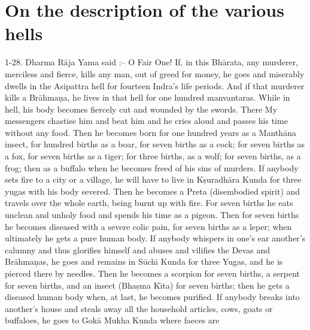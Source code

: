 \chapter{On the description of the various hells}

1-28. Dharma R\=aja Yama said :-- O Fair One! If, in this Bh\=arata, any murderer, merciless and fierce, kills any man, out of greed for money, he goes and miserably dwells in the Asipattra hell for fourteen Indra's life periods. And if that murderer kills a Br\=ahma\d{n}a, he lives in that hell for one hundred manvantaras. While in hell, his body becomes fiercely cut and wounded by the swords. There My messengers chastise him and beat him and he cries aloud and passes his time without any food. Then he becomes born for one hundred years as a Manth\=ana insect, for hundred births as a boar, for seven births as a cock; for seven births as a fox, for seven births as a tiger; for three births, as a wolf; for seven births, as a frog; then as a buffalo when he becomes freed of his sins of murders. If anybody sets fire to a city or a village, he will have to live in K\d{s}uradh\=ara Kunda for three yugas with his body severed. Then he becomes a Preta (disembodied spirit) and travels over the whole earth, being burnt up with fire. For seven births he eats unclean and unholy food and spends his time as a pigeon. Then for seven births he becomes diseased with a severe colic pain, for seven births as a leper; when ultimately he gets a pure human body. If anybody whispers in one's ear another's calumny and thus glorifies himself and abuses and vilifies the Devas and Br\=ahma\d{n}as, he goes and remains in S\=uch\={\i} Kunda for three Yugas, and he is pierced there by needles. Then he becomes a scorpion for seven births, a serpent for seven births, and an insect (Bha\d{s}ma K\={\i}ta) for seven births; then he gets a diseased human body when, at last, he becomes purified. If anybody breaks into another's house and steals away all the household articles, cows, goats or buffaloes, he goes to Gok\=a Mukha Kunda where faeces are

